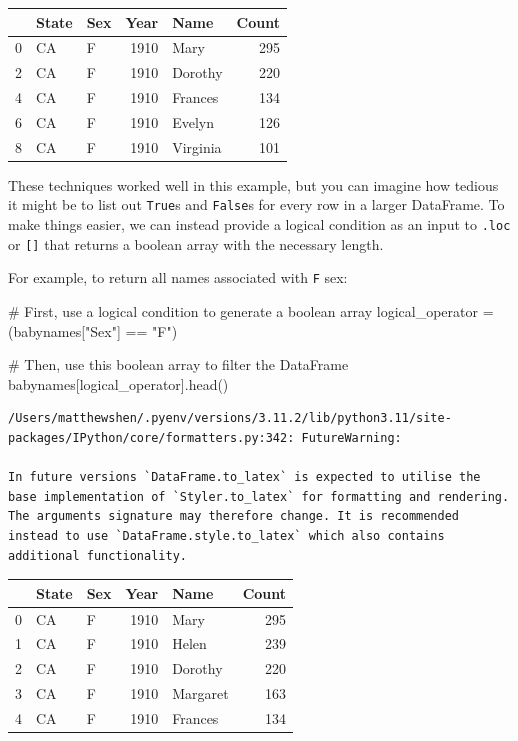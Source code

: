 \documentclass[
  letterpaper,
  DIV=11,
  numbers=noendperiod]{scrreprt}
\newenvironment{Shaded}{\begin{snugshade}}{\end{snugshade}}
\newcommand{\CommentTok}[1]{\textcolor[rgb]{0.37,0.37,0.37}{#1}}
\newcommand{\NormalTok}[1]{\textcolor[rgb]{0.00,0.23,0.31}{#1}}
\newcommand{\OperatorTok}[1]{\textcolor[rgb]{0.37,0.37,0.37}{#1}}
\newcommand{\StringTok}[1]{\textcolor[rgb]{0.13,0.47,0.30}{#1}}
\begin{document}
\begin{tabular}{lllrlr}
\toprule
{} & State & Sex &  Year &      Name &  Count \\
\midrule
0 &    CA &   F &  1910 &      Mary &    295 \\
2 &    CA &   F &  1910 &   Dorothy &    220 \\
4 &    CA &   F &  1910 &   Frances &    134 \\
6 &    CA &   F &  1910 &    Evelyn &    126 \\
8 &    CA &   F &  1910 &  Virginia &    101 \\
\bottomrule
\end{tabular}

These techniques worked well in this example, but you can imagine how
tedious it might be to list out \texttt{True}s and \texttt{False}s for
every row in a larger DataFrame. To make things easier, we can instead
provide a logical condition as an input to \texttt{.loc} or
\texttt{{[}{]}} that returns a boolean array with the necessary length.

For example, to return all names associated with \texttt{F} sex:

\begin{Shaded}
\begin{Highlighting}[]
\CommentTok{\# First, use a logical condition to generate a boolean array}
\NormalTok{logical\_operator }\OperatorTok{=}\NormalTok{ (babynames[}\StringTok{"Sex"}\NormalTok{] }\OperatorTok{==} \StringTok{"F"}\NormalTok{)}

\CommentTok{\# Then, use this boolean array to filter the DataFrame}
\NormalTok{babynames[logical\_operator].head()}
\end{Highlighting}
\end{Shaded}

\begin{verbatim}
/Users/matthewshen/.pyenv/versions/3.11.2/lib/python3.11/site-packages/IPython/core/formatters.py:342: FutureWarning:

In future versions `DataFrame.to_latex` is expected to utilise the base implementation of `Styler.to_latex` for formatting and rendering. The arguments signature may therefore change. It is recommended instead to use `DataFrame.style.to_latex` which also contains additional functionality.
\end{verbatim}

\begin{tabular}{lllrlr}
\toprule
{} & State & Sex &  Year &      Name &  Count \\
\midrule
0 &    CA &   F &  1910 &      Mary &    295 \\
1 &    CA &   F &  1910 &     Helen &    239 \\
2 &    CA &   F &  1910 &   Dorothy &    220 \\
3 &    CA &   F &  1910 &  Margaret &    163 \\
4 &    CA &   F &  1910 &   Frances &    134 \\
\bottomrule
\end{tabular}
\end{document}
